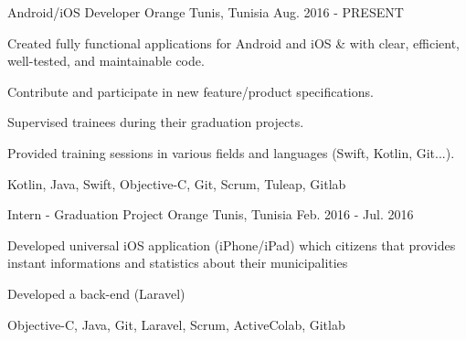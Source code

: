 

\begin{cventries}

  \cventrydetailed
    {Android/iOS Developer} %
    {Orange} %
    {Tunis, Tunisia} %
    {Aug. 2016 - PRESENT} %
    {
      \begin{cvitems} %
        \item {Created fully functional applications for Android and iOS \& with clear, efficient, well-tested, and maintainable code.}
        \item {Contribute and participate in new feature/product specifications.}
        \item {Supervised trainees during their graduation projects.}
        \item {Provided training sessions in various fields and languages (Swift, Kotlin, Git...).}
      \end{cvitems}
    }
    {Kotlin, Java, Swift, Objective-C, Git, Scrum, Tuleap, Gitlab} %
    
  \cventrydetailed
    {Intern - Graduation Project} %
    {Orange} %
    {Tunis, Tunisia} %
    {Feb. 2016 - Jul. 2016} %
    {
      \begin{cvitems} %
        \item {Developed universal iOS application (iPhone/iPad) which citizens that provides instant informations and statistics about their municipalities}
        \item {Developed a back-end (Laravel)}
      \end{cvitems}
    }
    {Objective-C, Java, Git, Laravel, Scrum, ActiveColab, Gitlab} %


\end{cventries}
